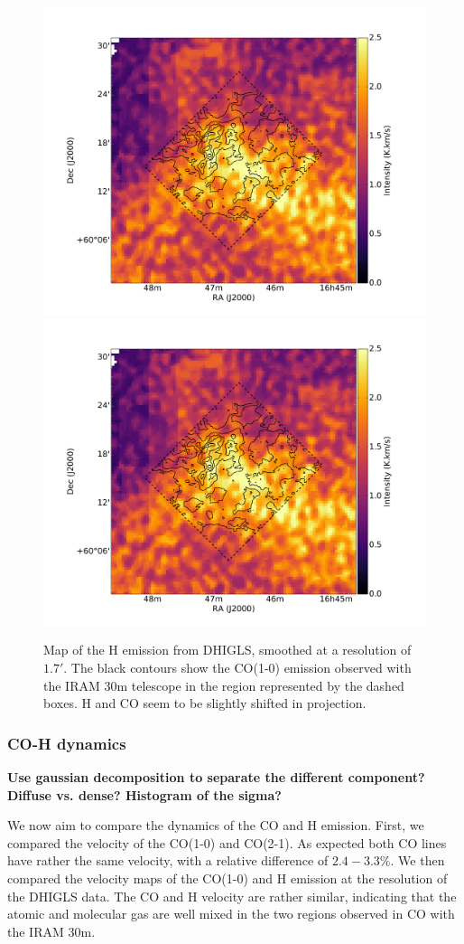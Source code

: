 \documentclass[traditabstract]{aa}
\begin{document}
\begin{figure}[h!]
  \centering
  \includegraphics[page=1,width=0.48\linewidth,trim=65 35 115 75,clip=true]{Figures/HI-CO.pdf}
  \hspace{3mm}
  \includegraphics[page=2,width=0.48\linewidth,trim=65 35 115 75,clip=true]{Figures/HI-CO.pdf}
  \caption{\label{DRAO-CO} Map of the H emission from DHIGLS, smoothed at a resolution of $1.7'$. The black contours show the CO(1-0) emission observed with the IRAM 30m telescope in the region represented by the dashed boxes. H and CO seem to be slightly shifted in projection.}
\end{figure}


      \subsubsection{CO-H dynamics}

\textbf{Use gaussian decomposition to separate the different component? Diffuse vs. dense? Histogram of the sigma?}

   We now aim to compare the dynamics of the CO and H emission. First, we compared the velocity of the CO(1-0) and CO(2-1). As expected both CO lines have rather the same velocity, with a relative difference of $2.4-3.3\%$. We then compared the velocity maps of the CO(1-0) and H emission at the resolution of the DHIGLS data. The CO and H velocity are rather similar, indicating that the atomic and molecular gas are well mixed in the two regions observed in CO with the IRAM 30m.
\end{document}
